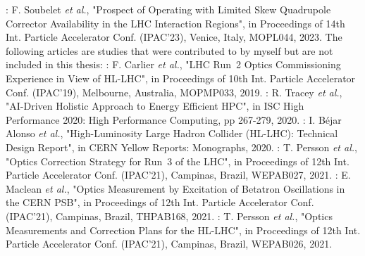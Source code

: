 \begin{declaration}
\noindent{}: F. Soubelet \textit{et al.}, "Prospect of Operating with Limited Skew Quadrupole Corrector Availability in the LHC Interaction Regions", in Proceedings of \num{14}th Int. Particle Accelerator Conf. (IPAC'23), Venice, Italy, MOPL044, \num{2023}.
\newline
\newline
\indent
The following articles are studies that were contributed to by myself but are not included in this thesis:
\newline \newline
\noindent\cite{IPAC:Tomas:Run2_Experience_View_LHC_HLLHC}: F. Carlier \textit{et al.}, "LHC Run~\num{2} Optics Commissioning Experience in View of HL-LHC", in Proceedings of \num{10}th Int. Particle Accelerator Conf. (IPAC'19), Melbourne, Australia, MOPMP033, \num{2019}.
\newline \newline
\noindent\cite{HPC:Tracey:AI_Holistic}: R. Tracey \textit{et al.}, "AI-Driven Holistic Approach to Energy Efficient HPC", in ISC High Performance \num{2020}: High Performance Computing, pp \num{267}-\num{279}, \num{2020}.
\newline \newline
\noindent\cite{REPORT:Apollinari:HL_LHC_TDR}: I. Béjar Alonso \textit{et al.}, "High-Luminosity Large Hadron Collider (HL-LHC): Technical Design Report", in CERN Yellow Reports: Monographs, \num{2020}.
\newline \newline
\noindent\cite{IPAC:Persson:Optics_Correction_Strategy_2021}: T. Persson \textit{et al.}, "Optics Correction Strategy for Run~\num{3} of the LHC", in Proceedings of \num{12}th Int. Particle Accelerator Conf. (IPAC'21), Campinas, Brazil, WEPAB027, \num{2021}.
\newline \newline
\noindent\cite{IPAC:Maclean:Optics_Measurement_Excitation_Betatron_Oscillations_PSB}: E. Maclean \textit{et al.}, "Optics Measurement by Excitation of Betatron Oscillations in the CERN PSB", in Proceedings of \num{12}th Int. Particle Accelerator Conf. (IPAC'21), Campinas, Brazil, THPAB168, \num{2021}.
\newline \newline
\noindent\cite{IPAC:Persson:Optics_Measurements_Correction_Plans_HLLHC}: T. Persson \textit{et al.}, "Optics Measurements and Correction Plans for the HL-LHC", in Proceedings of \num{12}th Int. Particle Accelerator Conf. (IPAC'21), Campinas, Brazil, WEPAB026, \num{2021}.

\end{declaration}
